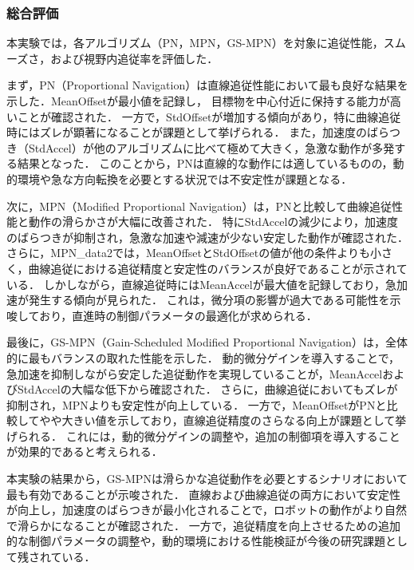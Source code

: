 \subsubsection{総合評価}
本実験では，各アルゴリズム（PN，MPN，GS-MPN）を対象に追従性能，スムーズさ，および視野内追従率を評価した．

まず，PN（Proportional Navigation）は直線追従性能において最も良好な結果を示した．MeanOffsetが最小値を記録し，
目標物を中心付近に保持する能力が高いことが確認された．
一方で，StdOffsetが増加する傾向があり，特に曲線追従時にはズレが顕著になることが課題として挙げられる．
また，加速度のばらつき（StdAccel）が他のアルゴリズムに比べて極めて大きく，急激な動作が多発する結果となった．
このことから，PNは直線的な動作には適しているものの，動的環境や急な方向転換を必要とする状況では不安定性が課題となる．

次に，MPN（Modified Proportional Navigation）は，PNと比較して曲線追従性能と動作の滑らかさが大幅に改善された．
特にStdAccelの減少により，加速度のばらつきが抑制され，急激な加速や減速が少ない安定した動作が確認された．
さらに，MPN\_data2では，MeanOffsetとStdOffsetの値が他の条件よりも小さく，曲線追従における追従精度と安定性のバランスが良好であることが示されている．
しかしながら，直線追従時にはMeanAccelが最大値を記録しており，急加速が発生する傾向が見られた．
これは，微分項の影響が過大である可能性を示唆しており，直進時の制御パラメータの最適化が求められる．

最後に，GS-MPN（Gain-Scheduled Modified Proportional Navigation）は，全体的に最もバランスの取れた性能を示した．
動的微分ゲインを導入することで，急加速を抑制しながら安定した追従動作を実現していることが，MeanAccelおよびStdAccelの大幅な低下から確認された．
さらに，曲線追従においてもズレが抑制され，MPNよりも安定性が向上している．
一方で，MeanOffsetがPNと比較してやや大きい値を示しており，直線追従精度のさらなる向上が課題として挙げられる．
これには，動的微分ゲインの調整や，追加の制御項を導入することが効果的であると考えられる．

本実験の結果から，GS-MPNは滑らかな追従動作を必要とするシナリオにおいて最も有効であることが示唆された．
直線および曲線追従の両方において安定性が向上し，加速度のばらつきが最小化されることで，ロボットの動作がより自然で滑らかになることが確認された．
一方で，追従精度を向上させるための追加的な制御パラメータの調整や，動的環境における性能検証が今後の研究課題として残されている．
